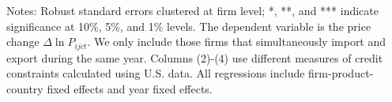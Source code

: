 \documentclass[12pt]{article}
\begin{document}
\begin{table}
\begin{threeparttable}
\begin{tabular}{lcccccccc}
			\bottomrule
		\end{tabular}
		\begin{tablenotes}
			\footnotesize
			\item[Notes:] Robust standard errors clustered at firm level; *, **, and *** indicate significance at 10\%, 5\%, and 1\% levels. The dependent variable is the price change $\Delta \ln P_{ijct}$. We only include those firms that simultaneously import and export during the same year. Columns (2)-(4) use different measures of credit constraints calculated using U.S. data. All regressions include firm-product-country fixed effects and year fixed effects.
		\end{tablenotes}
	\end{threeparttable}
	\label{tab.robust.tradetype}
\end{table}
\end{document}
